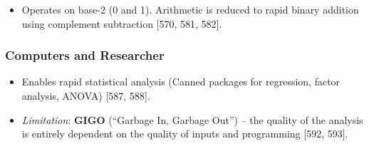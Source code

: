 \documentclass[
]{article}
\providecommand{\tightlist}{%
  \setlength{\itemsep}{0pt}\setlength{\parskip}{0pt}}
\begin{document}
\begin{itemize}
\tightlist
\item
  Operates on base-2 (0 and 1). Arithmetic is reduced to rapid binary
  addition using complement subtraction {[}570, 581, 582{]}.
\end{itemize}

\subsubsection{Computers and Researcher}\label{computers-and-researcher}

\begin{itemize}
\tightlist
\item
  Enables rapid statistical analysis (Canned packages for regression,
  factor analysis, ANOVA) {[}587, 588{]}.
\item
  \emph{Limitation}: \textbf{GIGO} (``Garbage In, Garbage Out'') -- the
  quality of the analysis is entirely dependent on the quality of inputs
  and programming {[}592, 593{]}.
\end{itemize}
\end{document}
